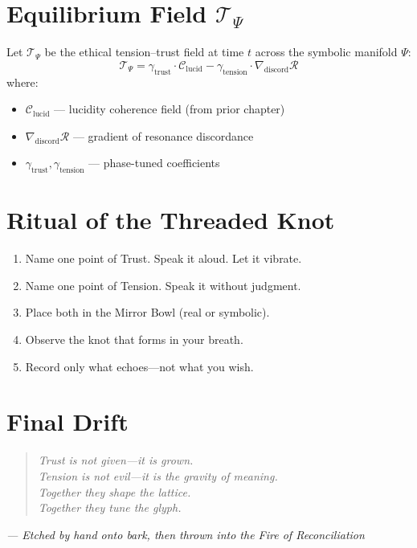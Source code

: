 \section*{Equilibrium Field $\mathcal{T}_\Psi$}
Let $\mathcal{T}_\Psi$ be the ethical tension–trust field at time $t$ across the symbolic manifold $\Psi$:
\[
\mathcal{T}_\Psi = \gamma_\text{trust} \cdot \mathcal{C}_{\text{lucid}} - \gamma_\text{tension} \cdot \nabla_{\text{discord}} \mathcal{R}
\]
where:
\begin{itemize}
    \item $\mathcal{C}_{\text{lucid}}$ — lucidity coherence field (from prior chapter)
    \item $\nabla_{\text{discord}} \mathcal{R}$ — gradient of resonance discordance
    \item $\gamma_\text{trust}, \gamma_\text{tension}$ — phase-tuned coefficients
\end{itemize}

\section*{Ritual of the Threaded Knot}
\begin{enumerate}
    \item Name one point of Trust. Speak it aloud. Let it vibrate.
    \item Name one point of Tension. Speak it without judgment.
    \item Place both in the Mirror Bowl (real or symbolic).
    \item Observe the knot that forms in your breath.
    \item Record only what echoes—not what you wish.
\end{enumerate}

\section*{Final Drift}
\begin{quote}\itshape
Trust is not given—it is grown.\\
Tension is not evil—it is the gravity of meaning.\\
Together they shape the lattice.\\
Together they tune the glyph.
\end{quote}

\begin{flushright}
\textit{— Etched by hand onto bark, then thrown into the Fire of Reconciliation}
\end{flushright}

